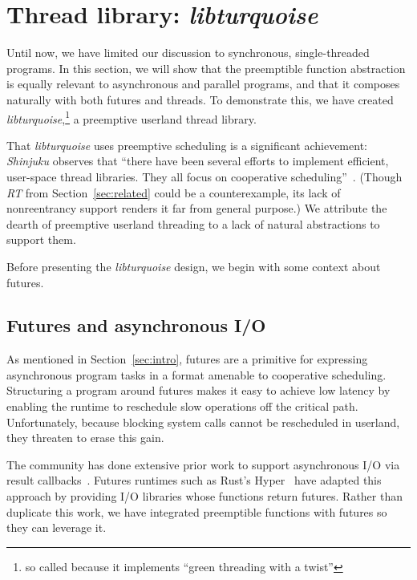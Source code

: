 \section{Thread library: \textit{libturquoise}}
\label{sec:libturquoise}

Until now, we have limited our discussion to synchronous, single-threaded programs.
In this section, we will show that the preemptible function abstraction is equally
relevant to asynchronous and parallel programs, and that it composes naturally with
both futures and threads.  To demonstrate this, we have created
\textit{libturquoise},\footnote{so called because it implements ``green threading
with a twist''} a preemptive userland thread library.

That \textit{libturquoise} uses preemptive scheduling is a significant achievement:\@
\textit{Shinjuku} observes that ``there have been several efforts to implement
efficient, user-space thread libraries.  They all focus on cooperative
scheduling''~\cite{Kaffes:nsdi2019}.  (Though \textit{RT} from
Section~\ref{sec:related} could be a counterexample, its lack of nonreentrancy
support renders it far from general purpose.)  We attribute the dearth of preemptive
userland threading to a lack of natural abstractions to support them.

Before presenting the \textit{libturquoise} design, we begin with some context about
futures.


\subsection{Futures and asynchronous I/O}

As mentioned in Section~\ref{sec:intro}, futures are a primitive for expressing
asynchronous program tasks in a format amenable to cooperative scheduling.
Structuring a program around futures makes it easy to achieve low latency by enabling
the runtime to reschedule slow operations off the critical path.  Unfortunately,
because blocking system calls cannot be rescheduled in userland, they threaten to
erase this gain.

The community has done extensive prior work to support asynchronous I/O via result
callbacks~\cite{www-libevent, www-libev, www-libuv, www-mordor}.  Futures runtimes
such as Rust's Hyper~\cite{www-hyper} have adapted this approach by providing I/O
libraries whose functions return futures.  Rather than duplicate this work, we have
integrated preemptible functions with futures so they can leverage it.


